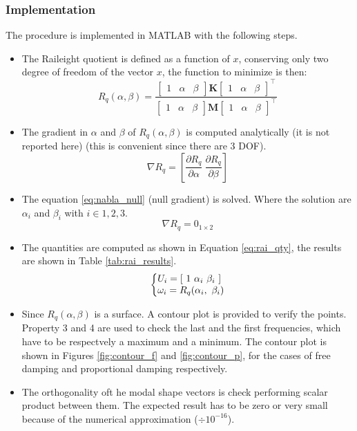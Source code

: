 \documentclass[twosided,a4paper]{article}           %
\makeatletter
\newcommand{\tr}{^{{\bm \top}}}
\newenvironment{sistema}%
{\left\lbrace\begin{array}{@{}l@{}}}%
	{\end{array}\right.}
\makeatother
\begin{document}
\subsubsection{Implementation}
The procedure is implemented in MATLAB with the following steps.
\begin{itemize}
	\item The Raileight quotient is defined as a function of $x$, conserving only two degree of freedom of the vector $x$, the function to minimize is then:
	\begin{equation}
		R_q(\alpha,\beta) = \dfrac{\begin{bmatrix} 1 & \alpha & \beta \end{bmatrix}   \bm{K}
		                    \begin{bmatrix} 1 & \alpha & \beta \end{bmatrix} \tr}{\begin{bmatrix} 1 & \alpha & \beta \end{bmatrix} \bm{M}
		                    \begin{bmatrix} 1 & \alpha & \beta \end{bmatrix} \tr}
	\end{equation}
	\item The gradient in $\alpha$ and $\beta$ of $R_q(\alpha,\beta)$ is computed analytically (it is not reported here)  (this is convenient since there are 3 DOF).
	\begin{equation}
		\nabla R_q = \left [ \dfrac{\partial R_q}{\partial \alpha} \ \dfrac{\partial R_q}{\partial \beta} \right ]
	\end{equation}
	\item The equation \eqref{eq:nabla_null} (null gradient) is solved. Where the solution are $\alpha_i$ and $\beta_i$ with $i \in 1,2,3$. 
	\begin{equation}
	\label{eq:nabla_null}
		\nabla R_q = 0_{1 \times 2}
	\end{equation}
	\item The quantities are computed as shown in Equation \eqref{eq:rai_qty}, the results are shown in Table \ref{tab:rai_results}.
	\begin{equation}
	\label{eq:rai_qty}
		\begin{sistema}
		U_i = \left [ \ 1 \ \alpha_i \ \beta_i \ \right ]\\
		\omega_i = R_q(\alpha_i, \ \beta_i)
		\end{sistema}
	\end{equation}
	\item Since $R_q(\alpha,\beta)$ is a surface. A contour plot is provided to verify the points. Property 3 and 4 are used to check the last and the first frequencies, which have to be respectvely a maximum and a minimum. The contour plot is shown in Figures \ref{fig:contour_f} and \ref{fig:contour_p}, for the cases of free damping and proportional damping respectively.
	\item The orthogonality oft he modal shape vectors is check performing scalar product between them. The expected result has to be zero or very small because of the numerical approximation ($\div 10^{-16}$).
	

\end{itemize}
\end{document}
